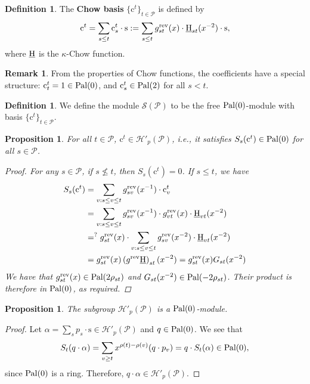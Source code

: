 \documentclass[11pt, letterpaper, english]{amsart}
\theoremstyle{teoremas}
\newtheorem{proposition}[theorem]{Proposition}
\theoremstyle{definition}
\newtheorem{definition}[theorem]{Definition}
\newtheorem{remark}[theorem]{Remark}
\newcommand{\rev}{\operatorname{rev}}
\newcommand{\calP}{\mathcal{P}}
\newcommand{\calH}{\mathcal{H}}
\newcommand{\calS}{\mathcal{S}}
\newcommand{\chow}{\normalfont\text{\underline{H}}}
\newcommand{\Ebasis}[1]{\mathrm{#1}}
\newcommand{\Cbasis}[1]{\mathrm{c}^{#1}}
\newcommand{\CbasisSub}[2]{\mathrm{c}^{#1}_{#2}}
\newcommand{\pal}{\normalfont\text{Pal}}
\begin{document}
\begin{definition}\label{def:chow-basis}
    The \textbf{Chow basis} \(\{\Cbasis{t}\}_{t \in \calP}\) is defined by
    \[
        \Cbasis{t} = \sum_{s \le t} \CbasisSub{t}{s}\cdot\Ebasis{s} :=
        \sum_{s \le t} g^{\rev}_{st}(x) \cdot \chow_{st}(x^{-2}) \cdot \Ebasis{s},
    \]
    where \(\chow\) is the \(\kappa\)-Chow function.
\end{definition}

\begin{remark}\label{rem:chow-basis-coefficients}
    From the properties of Chow functions, the coefficients have a special structure:
    \(\CbasisSub{t}{t} = 1 \in \pal(0)\), and \(\CbasisSub{t}{s} \in \pal(2)\) for all \(s < t\).
\end{remark}

\begin{definition}\label{def:palindromic-module}
    We define the module \(\calS(\calP)\) to be the free \(\pal(0)\)-module with basis \(\{\Cbasis{t}\}_{t \in \calP}\).
\end{definition}

\begin{proposition}\label{prop:chow-basis-in-Hp}
    For all \(t \in \calP\), \(\Cbasis{t} \in \calH'_p(\calP)\), i.e.,
    it satisfies \(S_s(\Cbasis{t}) \in \pal(0)\) for all \(s \in \calP\).
\begin{proof}
    For any \(s \in \calP\), if \(s \not\le t\), then \(S_s(\Cbasis{t}) = 0\). If \(s \le t\), we have
    \begin{align*}
        S_s(\Cbasis{t}) & = \sum_{v: s \le v \le t} g^{\rev}_{sv}(x^{-1})\cdot\CbasisSub{t}{v}                          \\
                        & = \sum_{v: s \le v \le t} g^{\rev}_{sv}(x^{-1})\cdot g^{\rev}_{vt}(x)\cdot \chow_{vt}(x^{-2}) \\
                        & =^? g^{\rev}_{st}(x)\cdot \sum_{v: s \le v \le t} g^{\rev}_{sv}(x^{-2})\cdot \chow_{vt}(x^{-2})\\
                        & = g^{\rev}_{st}(x)\left(g^{\rev}\chow\right)_{st}(x^{-2}) = g^{\rev}_{st}(x)G_{st}(x^{-2})
    \end{align*}
    We have that \(g^{\rev}_{st}(x)\in \pal(2\rho_{st})\) and \(G_{st}(x^{-2})\in \pal(-2\rho_{st})\). Their product is therefore in \(\pal(0)\), as required.
\end{proof}
\end{proposition}

\begin{proposition}\label{prop:Hp_is_pal0_mod}
    The subgroup \(\calH'_p(\calP)\) is a \(\pal(0)\)-module.
\end{proposition}
\begin{proof}
    Let \(\alpha = \sum_s p_s \cdot \Ebasis{s} \in \calH'_p(\calP)\) and \(q \in \pal(0)\).
    We see that
    \[ S_t(q \cdot \alpha) = \sum_{v \ge t} x^{\rho(t)-\rho(v)} (q \cdot p_v)
        = q \cdot S_t(\alpha) \in \pal(0), \]
    since \(\pal(0)\) is a ring. Therefore, \(q \cdot \alpha \in \calH'_p(\calP)\).
\end{proof}
\end{document}
